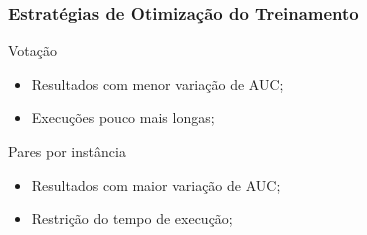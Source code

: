 \begin{frame}
    \frametitle{Estratégias de Otimização do Treinamento}

    \begin{block}{Votação}
        \begin{itemize}
            \item Resultados com menor variação de AUC;
            \item Execuções pouco mais longas;
        \end{itemize}
    \end{block}

    \begin{block}{Pares por instância}
        \begin{itemize}
            \item Resultados com maior variação de AUC;
            \item Restrição do tempo de execução;
        \end{itemize}
    \end{block}
\end{frame}

